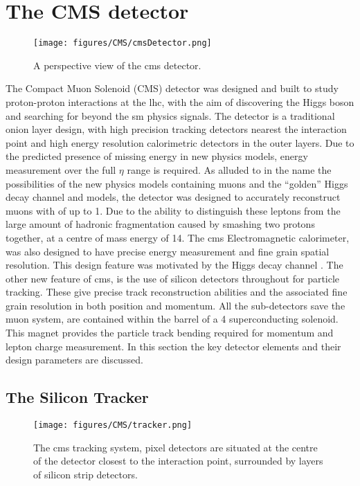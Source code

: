 \chapter{The CMS detector} %
\label{cha:the_cms_detector}
\begin{figure}[htbp]
  \centering
    \texttt{[image: figures/CMS/cmsDetector.png]}
  \caption{A perspective view of the \ac{cms} detector\cite{cms-sketchup}.}
  \label{fig:figures_CMS_cmsDetector}
\end{figure}

The Compact Muon Solenoid (CMS) detector was designed and built to study proton-proton interactions at the \ac{lhc}, with the aim of discovering the Higgs boson and searching for beyond the \ac{sm} physics signals. The detector is a traditional onion layer design, with high precision tracking detectors nearest the interaction point and high energy resolution calorimetric detectors in the outer layers. Due to the predicted presence of missing energy \MET in new
physics models, energy measurement over the full $\eta$ range is required. As
alluded to in the name the possibilities of the new physics models containing
muons and the ``golden'' Higgs decay channel
\HepProcess{\PH\to\PZ\PZ\to\Pmu\Pmu\Pmu\Pmu} and \PZprime models, the detector
was designed to accurately reconstruct muons with \PT of up to \unit{1}{\TeV}.
Due to the ability to distinguish these
leptons from the large amount of hadronic fragmentation caused by smashing two
protons together, at a centre of mass energy of \unit{14}{\TeV}. The \ac{cms}
Electromagnetic calorimeter, was also designed to have precise energy
measurement and fine grain spatial resolution. This design feature was
motivated by the Higgs decay channel \HepProcess{\PH\to\Pphoton\Pphoton}. The
other new feature of \ac{cms}, is the use of silicon detectors throughout for
particle tracking. These give precise track reconstruction abilities and the
associated fine grain resolution in both position and momentum. All the
sub-detectors save the muon system, are contained within the barrel of a
\unit{4}{\tesla} superconducting solenoid. This magnet provides the particle
track bending required for momentum and lepton charge measurement. In this
section the key detector elements and their design parameters are discussed.

\section{The Silicon Tracker} %
\label{sec:the_silicon_tracker}
\begin{figure}[htbp]
  \centering
    \texttt{[image: figures/CMS/tracker.png]}
  \caption{The \ac{cms} tracking system, pixel detectors are situated at the
  centre of the detector closest to the interaction point, surrounded by layers
  of silicon strip detectors\cite{cms-sketchup}.}
  \label{fig:figures_CMS_tracker}
\end{figure}

